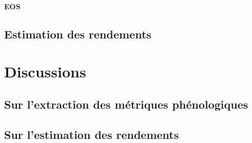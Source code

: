 \paragraph{EOS}

\subsection{Estimation des rendements}
  
\section{Discussions}

\subsection{Sur l'extraction des métriques phénologiques}

\subsection{Sur l'estimation des rendements}
